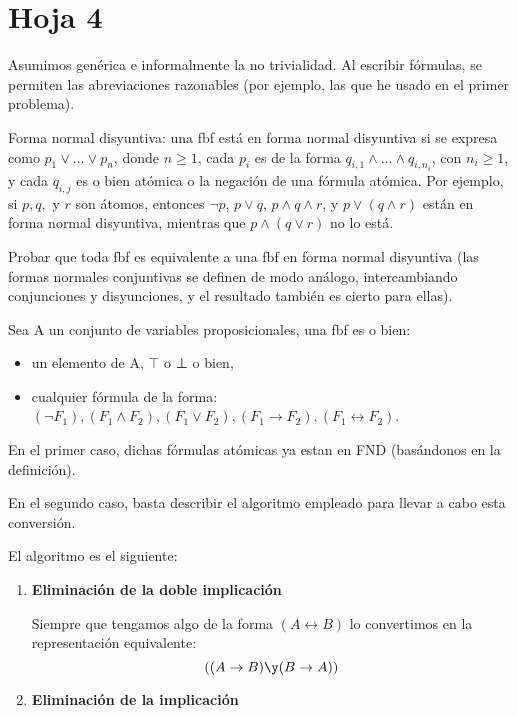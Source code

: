 \section{Hoja 4}

Asumimos gen\'erica e informalmente la no trivialidad. Al escribir f\'ormulas, se permiten
las abreviaciones razonables (por ejemplo, las que he usado en el primer problema).

\begin{problem}[1]
Forma normal disyuntiva: una fbf est\'a en forma normal
disyuntiva si se expresa como $p_1 \vee \dots \vee p_n$,
donde $n\ge1$,  cada $p_i$ es de la forma
$q_{i, 1} \wedge \dots \wedge q_{i,n_i}$, con $n_i\ge1$,
y cada $q_{i, j}$ es o bien at\'omica o la negaci\'on de una f\'ormula at\'omica.
Por ejemplo, si $p, q, $ y $r$ son \'atomos, entonces $\neg p$, $p\vee q$,
$p \wedge q \wedge r$, y  $p \vee (q \wedge r)$ est\'an en forma normal disyuntiva,
mientras que  $p \wedge (q \vee r)$ no lo est\'a.

Probar que toda fbf
es equivalente a una fbf en forma normal disyuntiva (las formas
normales conjuntivas se definen de modo an\'alogo, intercambiando conjunciones
y disyunciones, y el resultado tambi\'en es cierto para ellas).

\solution
Sea A un conjunto de variables proposicionales, una fbf es o bien:
\begin{itemize}
\item un elemento de A, $\top$ o ⊥ o bien,
\item cualquier fórmula de la forma: 
$(\neg F_1), (F_1\wedge F_2), (F_1 \vee F_2), (F_1 \to F_2), (F_1 \leftrightarrow F_2)$.
\end{itemize}

En el primer caso, dichas fórmulas atómicas ya estan en FND (basándonos en la definición).

En el segundo caso, basta describir el algoritmo empleado para llevar a cabo esta conversión.

El algoritmo es el siguiente:
\begin{enumerate}
\item \textbf{Eliminación de la doble implicación}

Siempre que tengamos algo de la forma $(A \leftrightarrow B)$ lo convertimos en la representación equivalente:
\[((A \to B) \y (B \to A))\]

\item \textbf{Eliminación de la implicación}


\end{enumerate}
\end{problem}
